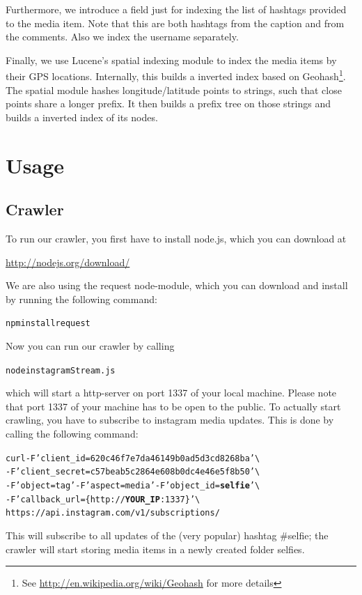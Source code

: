 \documentclass[11pt]{article}
\begin{document}
		Furthermore, we introduce a field just for indexing the list of hashtags provided to the media item. Note that this are both hashtags from the caption and from the comments. Also we index the username separately.

		Finally, we use Lucene's spatial indexing module to index the media items by their GPS locations. Internally, this builds a inverted index based on Geohash\footnote{See \url{http://en.wikipedia.org/wiki/Geohash} for more details}. The spatial module hashes longitude/latitude points to strings, such that close points share a longer prefix. It then builds a prefix tree on those strings and builds a inverted index of its nodes.

\section{Usage}
	\subsection{Crawler}
		To run our crawler, you first have to install node.js, which you can download at 
		\begin{center}{\vspace{-3mm}\url{http://nodejs.org/download/}}\end{center}
		We are also using the request node-module, which you can download and install by running the following command:
		\begin{alltt}
			npm install request
		\end{alltt}
		Now you can run our crawler by calling
		\begin{alltt}
			node instagramStream.js
		\end{alltt}
		which will start a http-server on port 1337 of your local machine. Please note that port 1337 of your machine has to be open to the public. To actually start crawling, you have to subscribe to instagram media updates. This is done by calling the following command:
		\begin{alltt}
			curl -F 'client_id=620c46f7e7da46149b0ad5d3cd8268ba' \textbackslash 
			     -F 'client_secret=c57beab5c2864e608b0dc4e46e5f8b50' \textbackslash
			     -F 'object=tag' -F 'aspect=media' -F 'object_id=\textbf{selfie}' \textbackslash
			     -F 'callback_url=\{http://\textbf{YOUR_IP}:1337\}' \textbackslash
			     https://api.instagram.com/v1/subscriptions/
		\end{alltt}
		This will subscribe to all updates of the (very popular) hashtag $\#$selfie; the crawler will start storing media items in a newly created folder selfies.
\end{document}
